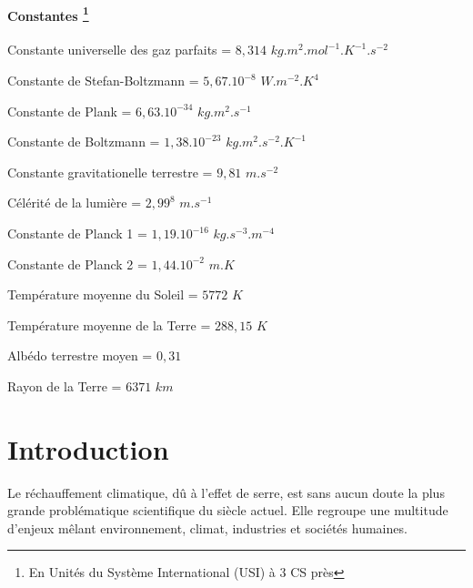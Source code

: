 \documentclass[a4paper, 12pt]{report} %
\begin{document}
\begin{description}
	\subsubsection*{Constantes \footnote{En Unités du Système International (USI) à 3 CS près}}
	\item[\boldmath{$R$}:] Constante universelle des gaz parfaits = $8,314$ $kg.m^2.mol^{-1}.K^{-1}.s^{-2}$
	\item[\boldmath{$\sigma$}:] Constante de Stefan-Boltzmann = $5,67.10^{-8}$ $W.m^{-2}.K^{4}$
	\item[\boldmath{$h$}:] Constante de Plank = $6,63.10^{-34}$ $kg.m^2.s^{-1}$
 	\item[\boldmath{$k_B$}:] Constante de Boltzmann = $1,38.10^{-23}$ $kg.m^2.s^{-2}.K^{-1}$
  	\item[\boldmath{$g$}:] Constante gravitationelle terrestre = $9,81$ $m.s^{-2}$
   	\item[\boldmath{$c_0$}:] Célérité de la lumière = $2,99^8$ $m.s^{-1}$
    \item[\boldmath{$C_1$}:] Constante de Planck 1 = $1,19.10^{-16}$ $kg.s^{-3}.m^{-4}$
    \item[\boldmath{$C_2$}:] Constante de Planck 2 = $1,44.10^{-2}$ $m.K$
    \item[\boldmath{$T_s$}:] Température moyenne du Soleil = $5 772$ $K$
    \item[\boldmath{$T_T$}:] Température moyenne de la Terre = $288,15$ $K$
	\item[\boldmath{$\bar{a_T}$}:] Albédo terrestre moyen = $0,31$
    \item[\boldmath{$R_T$}:] Rayon de la Terre = $6 371$ $km$

\end{description}


\newpage
\chapter*{Introduction}				

\indent Le réchauffement climatique, dû à l'effet de serre, est sans aucun doute la plus grande problématique 
scientifique du siècle actuel. Elle regroupe une multitude d'enjeux mêlant environnement,
climat, industries et sociétés humaines. \vspace{\baselineskip}
\end{document}
